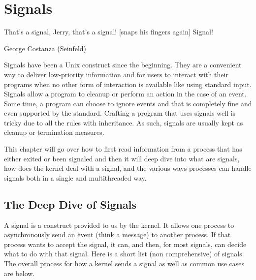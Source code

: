 \chapter{Signals}

\epigraph{That's a signal, Jerry, that's a signal! [snaps his fingers again] Signal!}{George Costanza (Seinfeld)}

Signals have been a Unix construct since the beginning. They are a convenient way to deliver low-priority information and for users to interact with their programs when no other form of interaction is available like using standard input. Signals allow a program to cleanup or perform an action in the case of an event. Some time, a program can choose to ignore events and that is completely fine and even supported by the standard. Crafting a program that uses signals well is tricky due to all the rules with inheritance. As such, signals are usually kept as cleanup or termination measures.

This chapter will go over how to first read information from a process that has either exited or been signaled and then it will deep dive into what are signals, how does the kernel deal with a signal, and the various ways processes can handle signals both in a single and multithreaded way.

\section{The Deep Dive of Signals}

A signal is a construct provided to us by the kernel. It allows one process to asynchronously send an event (think a message) to another process. If that process wants to accept the signal, it can, and then, for most signals, can decide what to do with that signal. Here is a short list (non comprehensive) of signals. The overall process for how a kernel sends a signal as well as common use cases are below.


